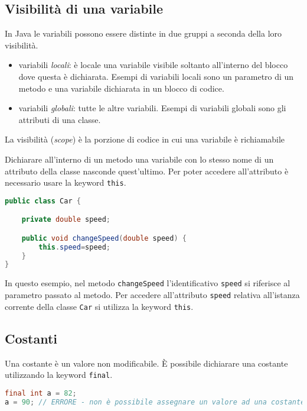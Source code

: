 \documentclass{article}
\begin{document}
\subsection{Visibilità di una variabile}

In Java le variabili possono essere distinte in due gruppi a seconda della loro visibilità.

\begin{itemize}
\item variabili \emph{locali}: è locale una variabile visibile soltanto all'interno del blocco dove questa è dichiarata.
Esempi di variabili locali sono un parametro di un metodo e una variabile dichiarata in un blocco di codice.
\item variabili \emph{globali}: tutte le altre variabili. Esempi di variabili globali sono gli attributi di una classe.
\end{itemize}

\begin{mydef} La visibilità (\emph{scope}) è la porzione di codice in cui una variabile è richiamabile
\end{mydef}
Dichiarare all'interno di un metodo una variabile con lo stesso nome di un attributo della classe nasconde quest'ultimo.
Per poter accedere all'attributo è necessario usare la keyword \texttt{this}.
\begin{lstlisting}[language=Java,escapechar=|]
public class Car {

	private double speed;

	public void changeSpeed(double speed) {
        this.speed=speed;   
   	}
}
\end{lstlisting}
In questo esempio, nel metodo \texttt{changeSpeed} l'identificativo \texttt{speed} si riferisce al parametro passato al metodo.
Per accedere all'attributo \texttt{speed} relativa all'istanza corrente della classe \texttt{Car} si utilizza la keyword \texttt{this}. 

\subsection{Costanti}
Una costante è un valore non modificabile.
È possibile dichiarare una costante utilizzando la keyword
\texttt{final}. 

\begin{lstlisting}[language=Java,escapechar=|]
final int a = 82;
a = 90; // ERRORE - non è possibile assegnare un valore ad una costante
\end{lstlisting}
\end{document}
